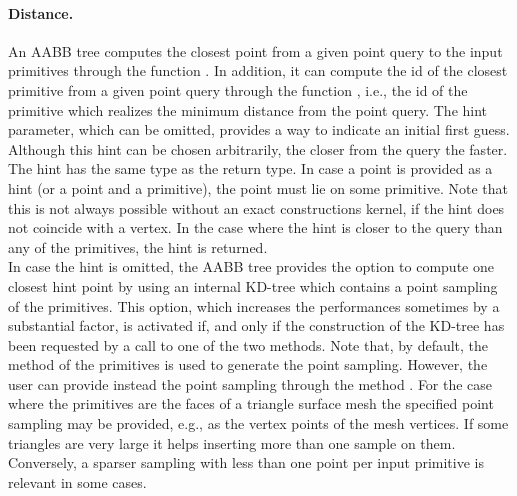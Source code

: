 \paragraph{Distance.} An AABB tree computes the closest point from a given point query to the input primitives through the function . In addition, it can compute the id of the closest primitive from a given point query through the function , i.e., the id of the primitive which realizes the minimum distance from the point query. The hint parameter, which can be omitted, provides a way to indicate an initial first guess. Although this hint can be chosen arbitrarily, the closer from the query the faster. The hint has the same type as the return type. In case a point is provided as a hint (or a point and a primitive), the point must lie on some primitive. Note that this is not always possible without an exact constructions kernel, if the hint does not coincide with a vertex. In the case where the hint is closer to the query than any of the primitives, the hint is returned.\\

In case the hint is omitted, the AABB tree provides the option to compute one closest hint point by using an internal KD-tree which contains a point sampling of the primitives. This option, which increases the performances sometimes by a substantial factor, is activated if, and only if the construction of the KD-tree has been requested by a call to one of the two  methods. Note that, by default, the method  of the primitives is used to generate the point sampling. However, the user can provide instead the point sampling through the method . For the case where the primitives are the faces of a triangle surface mesh the specified point sampling may be provided, e.g., as the vertex points of the mesh vertices. If some triangles are very large it helps inserting more than one sample on them. Conversely, a sparser sampling with less than one point per input primitive is relevant in some cases. 





